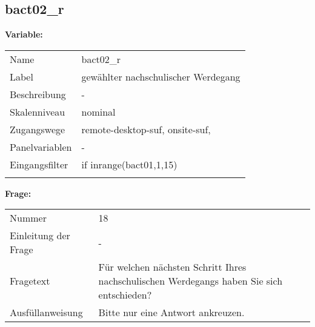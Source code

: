 	
	
	\subsection{bact02\_r}
	\label{subSection:bact02_r}

	\noindent\textbf{Variable:}\\
		\begin{tabular}{lL{11.3cm}}
			\label{tableVariable:bact02_r}
			Name & bact02\_r \\
			Label & gewählter nachschulischer Werdegang \\
			Beschreibung & - \\
			Skalenniveau & nominal \\
			Zugangswege &
				remote-desktop-suf,
				onsite-suf,
 \\
			Panelvariablen & -
			 \\
			Eingangsfilter & if inrange(bact01,1,15) \\
 \\
		\end{tabular}

		\vspace*{1 cm}
		\noindent\textbf{Frage:}\\
		\begin{tabular}{lL{11.3cm}}
			\label{tableQuestion:bact02_r}
			Nummer & 18 \\
			Einleitung der Frage & - \\
			Fragetext & Für welchen nächsten Schritt Ihres nachschulischen Werdegangs haben Sie sich entschieden? \\
			Ausfüllanweisung & Bitte nur eine Antwort ankreuzen. \\
		\end{tabular}





